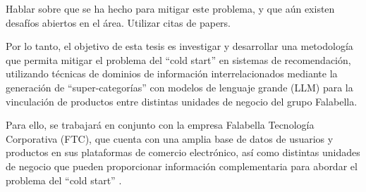 Hablar sobre que se ha hecho para mitigar este problema, y que aún existen desafíos abiertos en el área. Utilizar citas de papers.

Por lo tanto, el objetivo de esta tesis es investigar y desarrollar una metodología que permita mitigar el problema del \enquote{cold start} en sistemas de recomendación, utilizando técnicas de dominios de información interrelacionados mediante la generación de \enquote{super-categorías} con modelos de lenguaje grande (LLM) para la vinculación de productos entre distintas unidades de negocio del grupo Falabella.

Para ello, se trabajará en conjunto con la empresa Falabella Tecnología Corporativa (FTC), que cuenta con una amplia base de datos de usuarios y productos en sus plataformas de comercio electrónico, así como distintas unidades de negocio que pueden proporcionar información complementaria para abordar el problema del \enquote{cold start} \cite{L__2012}.